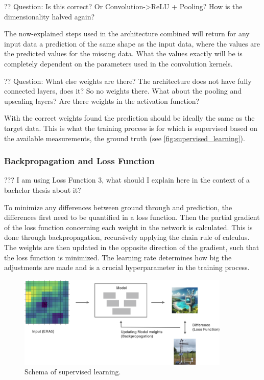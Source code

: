 ?? Question: Is this correct? Or Convolution->ReLU + Pooling? How is the dimensionality halved again?

The now-explained steps used in the architecture combined will return for any input data a prediction of the same shape as the input data, where the values are the predicted values for the missing data. What the values exactly will be is completely dependent on the parameters used in the convolution kernels.


?? Question: What else weights are there? The architecture does not have fully connected layers, does it? So no weights there. What about the pooling and upscaling layers? Are there weights in the activation function?

With the correct weights found the prediction should be ideally the same as the target data. This is what the training process is for which is supervised based on the available measurements, the ground truth (see \autoref{fig:supervised_learning}). 

\subsubsection*{Backpropagation and Loss Function}

??? I am using Loss Function 3, what should I explain here in the context of a bachelor thesis about it?

To minimize any differences between ground through and prediction, the differences first need to be quantified in a loss function. Then the partial gradient of the loss function concerning each weight in the network is calculated. This is done through backpropagation, recursively applying the chain rule of calculus. The weights are then updated in the opposite direction of the gradient, such that the loss function is minimized. The learning rate determines how big the adjustments are made and is a crucial hyperparameter in the training process. 


\begin{figure}
    \centering
    \includegraphics[width=0.9\textwidth]{resources/images/supervised_learning.png}
    \caption{Schema of supervised learning.}
    \label{fig:supervised_learning}
\end{figure}

